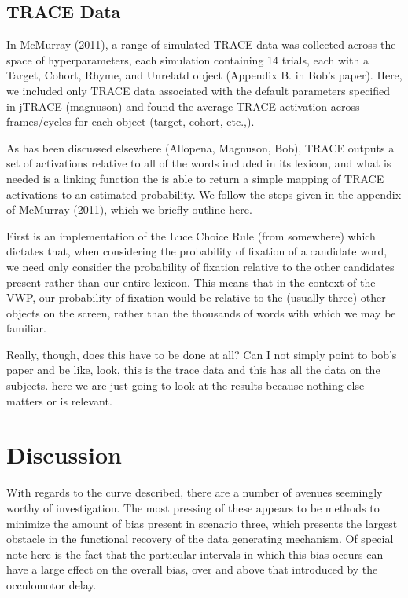\documentclass{article}
\begin{document}
\subsection{TRACE Data}

In McMurray (2011), a range of simulated TRACE data was collected across the space of hyperparameters, each simulation containing 14 trials, each with a Target, Cohort, Rhyme, and Unrelatd object (Appendix B. in Bob's paper). Here, we included only TRACE data associated with the default parameters specified in jTRACE (magnuson) and found the average TRACE activation across frames/cycles for each object (target, cohort, etc.,).

As has been discussed elsewhere (Allopena, Magnuson, Bob), TRACE outputs a set of activations relative to all of the words included in its lexicon, and what is needed is a linking function the is able to return a simple mapping of TRACE activations to an estimated probability. We follow the steps given in the appendix of McMurray (2011), which we briefly outline here. 

First is an implementation of the Luce Choice Rule (from somewhere) which dictates that, when considering the probability of fixation of a candidate word, we need only consider the probability of fixation relative to the other candidates present rather than our entire lexicon. This means that in the context of the VWP, our probability of fixation would be relative to the (usually three) other objects on the screen, rather than the thousands of words with which we may be familiar.  

Really, though, does this have to be done at all? Can I not simply point to bob's paper and be like, look, this is the trace data and this has all the data on the subjects. here we are just going to look at the results because nothing else matters or is relevant. 


\section{Discussion}


With regards to the curve described, there are a number of avenues seemingly worthy of investigation. The most pressing of these appears to be methods to minimize the amount of bias present in scenario three, which presents the largest obstacle in the functional recovery of the data generating mechanism. Of special note here is the fact that the particular intervals in which this bias occurs can have a large effect on the overall bias, over and above that introduced by the occulomotor delay. 
\end{document}
